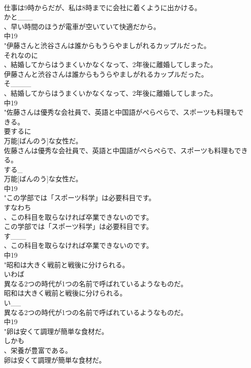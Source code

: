 \documentclass[8pt]{extreport}
\begin{document}
\begin{CJK}{UTF8}{min}
\\	仕事は9時からだが、私は8時までに会社に着くように出かける。
\\	かと___
\\	、早い時間のほうが電車が空いていて快適だから。
\\	中19
\\	"伊藤さんと渋谷さんは誰からもうらやましがれるカップルだった。
\\	それなのに
\\	、結婚してからはうまくいかなくなって、2年後に離婚してしまった。
\\	伊藤さんと渋谷さんは誰からもうらやましがれるカップルだった。
\\	そ____
\\	、結婚してからはうまくいかなくなって、2年後に離婚してしまった。
\\	中19
\\	"佐藤さんは優秀な会社員で、英語と中国語がぺらぺらで、スポーツも料理もできる。
\\	要するに
\\	万能[ばんのう]な女性だ。
\\	佐藤さんは優秀な会社員で、英語と中国語がぺらぺらで、スポーツも料理もできる。
\\	する_
\\	万能[ばんのう]な女性だ。
\\	中19
\\	"この学部では「スポーツ科学」は必要科目です。
\\	すなわち
\\	、この科目を取らなければ卒業できないのです。
\\	この学部では「スポーツ科学」は必要科目です。
\\	す___
\\	、この科目を取らなければ卒業できないのです。
\\	中19
\\	"昭和は大きく戦前と戦後に分けられる。
\\	いわば
\\	異なる2つの時代が1つの名前で呼ばれているようなものだ。
\\	昭和は大きく戦前と戦後に分けられる。
\\	い__
\\	異なる2つの時代が1つの名前で呼ばれているようなものだ。
\\	中19
\\	"卵は安くて調理が簡単な食材だ。
\\	しかも
\\	、栄養が豊富である。
\\	卵は安くて調理が簡単な食材だ。

\end{CJK}
\end{document}
